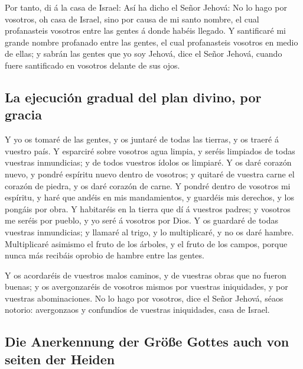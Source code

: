  Por tanto, di á la casa de Israel: Así ha dicho el Señor
Jehová: No lo hago por vosotros, oh casa de Israel, sino por causa de mi
santo nombre, el cual profanasteis vosotros entre las gentes á donde
habéis llegado.  Y santificaré mi grande nombre profanado
entre las gentes, el cual profanasteis vosotros en medio de ellas; y
sabrán las gentes que yo soy Jehová, dice el Señor Jehová, cuando fuere
santificado en vosotros delante de sus ojos.

\hypertarget{la-ejecuciuxf3n-gradual-del-plan-divino-por-gracia}{%
\subsection{La ejecución gradual del plan divino, por
gracia}\label{la-ejecuciuxf3n-gradual-del-plan-divino-por-gracia}}

 Y yo os tomaré de las gentes, y os juntaré de todas las
tierras, y os traeré á vuestro país.  Y esparciré sobre
vosotros agua limpia, y seréis limpiados de todas vuestras inmundicias;
y de todos vuestros ídolos os limpiaré.  Y os daré corazón
nuevo, y pondré espíritu nuevo dentro de vosotros; y quitaré de vuestra
carne el corazón de piedra, y os daré corazón de carne.  Y
pondré dentro de vosotros mi espíritu, y haré que andéis en mis
mandamientos, y guardéis mis derechos, y los pongáis por obra.
 Y habitaréis en la tierra que dí á vuestros padres; y
vosotros me seréis por pueblo, y yo seré á vosotros por Dios.
 Y os guardaré de todas vuestras inmundicias; y llamaré al
trigo, y lo multiplicaré, y no os daré hambre. 
Multiplicaré asimismo el fruto de los árboles, y el fruto de los campos,
porque nunca más recibáis oprobio de hambre entre las gentes.

 Y os acordaréis de vuestros malos caminos, y de vuestras
obras que no fueron buenas; y os avergonzaréis de vosotros mismos por
vuestras iniquidades, y por vuestras abominaciones.  No lo
hago por vosotros, dice el Señor Jehová, séaos notorio: avergonzaos y
confundíos de vuestras iniquidades, casa de Israel.

\hypertarget{die-anerkennung-der-gruxf6uxdfe-gottes-auch-von-seiten-der-heiden}{%
\subsection{Die Anerkennung der Größe Gottes auch von seiten der
Heiden}\label{die-anerkennung-der-gruxf6uxdfe-gottes-auch-von-seiten-der-heiden}}

